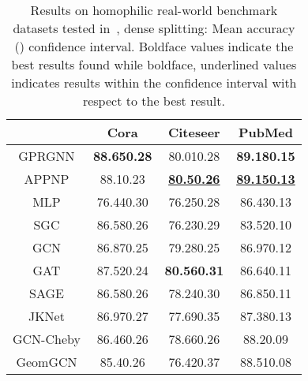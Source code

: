 \documentclass{article} \usepackage{iclr2021_conference,times}
\begin{document}
\begin{table}[ht]
\centering
\caption{Results on homophilic real-world benchmark datasets tested in~\citep{pei2019geom}, dense splitting: Mean accuracy ()   confidence interval. Boldface values indicate the best results found while boldface, underlined values indicates results within the confidence interval with respect to the best result.}
\label{tab:realdata_results2}
\scriptsize
\begin{tabular}{@{}cccc@{}}
\toprule
          & Cora                  & Citeseer                       & PubMed                \\ \midrule
GPRGNN & \textbf{88.65\tiny{0.28}} & 80.01\tiny{0.28}               & \textbf{89.18\tiny{0.15}}       \\
APPNP  & 88.1\tiny{0.23}           & {\ul \textbf{80.5\tiny{0.26}}} & {\ul \textbf{89.15\tiny{0.13}}} \\
MLP       & 76.44\tiny{0.30}  & 76.25\tiny{0.28}          & 86.43\tiny{0.13} \\
SGC       & 86.58\tiny{0.26}  & 76.23\tiny{0.29}          & 83.52\tiny{0.10} \\
GCN       & 86.87\tiny{0.25} & 79.28\tiny{0.25}          & 86.97\tiny{0.12} \\
GAT       & 87.52\tiny{0.24} & \textbf{80.56\tiny{0.31}} & 86.64\tiny{0.11} \\
SAGE      & 86.58\tiny{0.26} & 78.24\tiny{0.30} & 86.85\tiny{0.11} \\
JKNet     & 86.97\tiny{0.27} & 77.69\tiny{0.35}          & 87.38\tiny{0.13} \\
GCN-Cheby & 86.46\tiny{0.26} & 78.66\tiny{0.26}          & 88.2\tiny{0.09}  \\
GeomGCN   & 85.4\tiny{0.26}  & 76.42\tiny{0.37}          & 88.51\tiny{0.08} \\ \bottomrule
\end{tabular}
\normalsize
\end{table}
\end{document}
